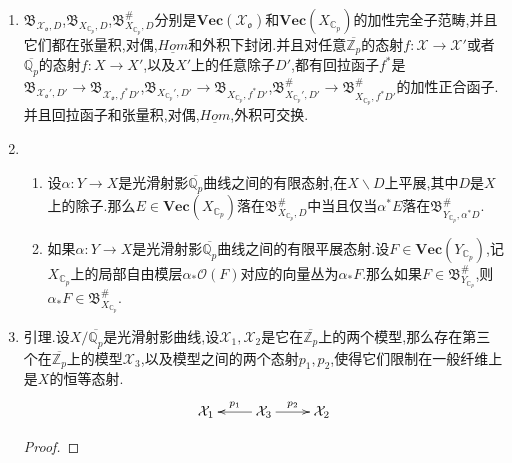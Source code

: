 \begin{enumerate}
\begin{proof}
    	\qquad
    	
    	按照正向系统和概形性质的兼容性,可以取$\overline{\mathbb{Q}_p}/\mathbb{Q}_p$的有限扩张$K/\mathbb{Q}_p$,使得$f$下降为$K$上光滑射影曲线之间的有限态射$f_K:X_K\to X'_K$,并且$\mathcal{X}'$可以下降为$X_K'$关于$\mathfrak{o}_K$的模型$\mathcal{X}'_{\mathfrak{o}_K}$【?】.
    	
    	\qquad
    	
    	$\mathcal{X}'_{\mathfrak{o}_K}$是整概形,取它在函数域$K(X_K)$中的正规化为$\widetilde{f}_{\mathfrak{o}_K}:\mathcal{X}_{\mathfrak{o}_K}\to\mathcal{X}'_{\mathfrak{o}_K}$.由于$f_K$是$X_K'$在$K(X_K)$中的正规化【?】,于是相应图表交换,于是基变换到$\overline{\mathbb{Z}_p}$得到想要的交换图表.
    \end{proof}
    \item $\mathfrak{B}_{\mathcal{X}_{\mathfrak{o}},D}$,$\mathfrak{B}_{X_{\mathbb{C}_p},D}$,$\mathfrak{B}_{X_{\mathbb{C}_p},D}^{\#}$分别是$\textbf{Vec}(\mathcal{X}_{\mathfrak{o}})$和$\textbf{Vec}(X_{\mathbb{C}_p})$的加性完全子范畴,并且它们都在张量积,对偶,$\underline{Hom}$和外积下封闭.并且对任意$\overline{\mathbb{Z}_p}$的态射$f:\mathcal{X}\to\mathcal{X}'$或者$\overline{\mathbb{Q}_p}$的态射$f:X\to X'$,以及$X'$上的任意除子$D'$,都有回拉函子$f^*$是$\mathfrak{B}_{\mathcal{X}_{\mathfrak{o}}',D'}\to\mathfrak{B}_{\mathcal{X}_{\mathfrak{o}},f^*D'}$,$\mathfrak{B}_{X_{\mathbb{C}_p}',D'}\to\mathfrak{B}_{X_{\mathbb{C}_p},f^*D'}$,$\mathfrak{B}_{X_{\mathbb{C}_p}',D'}^{\#}\to\mathfrak{B}_{X_{\mathbb{C}_p},f^*D'}^{\#}$的加性正合函子.并且回拉函子和张量积,对偶,$\underline{Hom}$,外积可交换.
    \item 
    \begin{enumerate}[(1)]
    	\item 设$\alpha:Y\to X$是光滑射影$\overline{\mathbb{Q}_p}$曲线之间的有限态射,在$X\backslash D$上平展,其中$D$是$X$上的除子.那么$E\in\textbf{Vec}(X_{\mathbb{C}_p})$落在$\mathfrak{B}_{X_{\mathbb{C}_p},D}^{\#}$中当且仅当$\alpha^*E$落在$\mathfrak{B}_{Y_{\mathbb{C}_p},\alpha^*D}^{\#}$.
    	\item 如果$\alpha:Y\to X$是光滑射影$\overline{\mathbb{Q}_p}$曲线之间的有限平展态射.设$F\in\textbf{Vec}(Y_{\mathbb{C}_p})$,记$X_{\mathbb{C}_p}$上的局部自由模层$\alpha_*\mathscr{O}(F)$对应的向量丛为$\alpha_*F$.那么如果$F\in\mathfrak{B}_{Y_{\mathbb{C}_p}}^{\#}$,则$\alpha_*F\in\mathfrak{B}_{X_{\mathbb{C}_p}}^{\#}$.
    \end{enumerate}
    \item 引理.设$X/\overline{\mathbb{Q}_p}$是光滑射影曲线,设$\mathcal{X}_1,\mathcal{X}_2$是它在$\overline{\mathbb{Z}_p}$上的两个模型,那么存在第三个在$\overline{\mathbb{Z}_p}$上的模型$\mathcal{X}_3$,以及模型之间的两个态射$p_1,p_2$,使得它们限制在一般纤维上是$X$的恒等态射.
    $$\xymatrix{\mathcal{X}_1&\mathcal{X}_3\ar[l]_{p_1}\ar[r]^{p_2}&\mathcal{X}_2}$$
    \begin{proof}
    	

\end{proof}
\end{enumerate}
